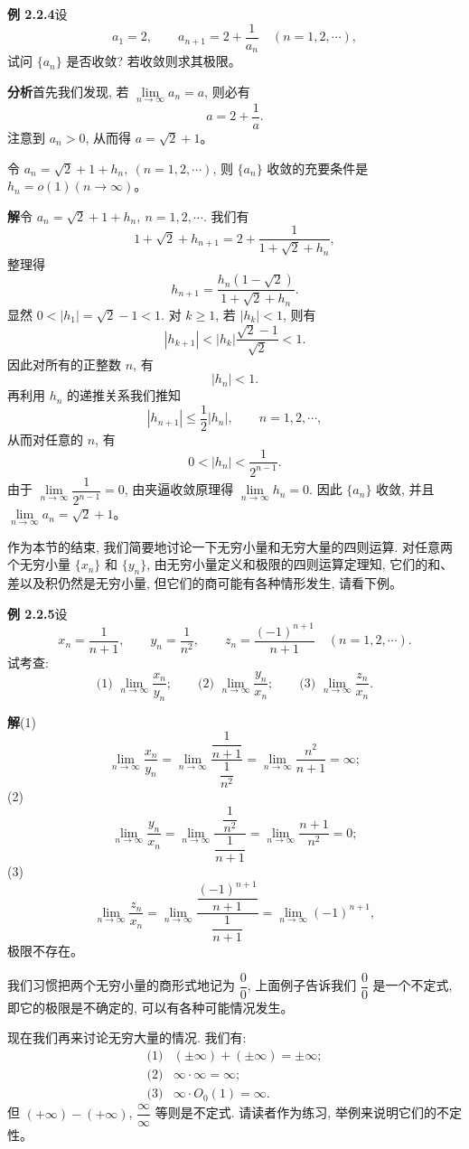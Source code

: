 \documentclass[UTF8,12pt,a4paper,fontset=fandol]{ctexart}
\begin{document}
\noindent\textbf{例 2.2.4}\quad 设
\[
  a_1=2,\qquad a_{n+1}=2+\frac1{a_n}\quad(n=1,2,\cdots),
\]
试问 $\{a_n\}$ 是否收敛? 若收敛则求其极限。

\noindent\textbf{分析}\quad 首先我们发现, 若 $\lim\limits_{n\to\infty}a_n=a$, 则必有
\[
  a=2+\frac1a.
\]
注意到 $a_n>0$, 从而得 $a=\sqrt2+1$。

令 $a_n=\sqrt2+1+h_n,\ (n=1,2,\cdots)$, 则 $\{a_n\}$ 收敛的充要条件是 $h_n=o(1)(n\to\infty)$。

\noindent\textbf{解}\quad 令 $a_n=\sqrt2+1+h_n,\ n=1,2,\cdots$. 我们有
\[
  1+\sqrt2+h_{n+1}=2+\frac1{1+\sqrt2+h_n},
\]
整理得
\[
  h_{n+1}=\frac{h_n(1-\sqrt2)}{1+\sqrt2+h_n}.
\]
显然 $0<|h_1|=\sqrt2-1<1$. 对 $k\geqslant1$, 若 $|h_k|<1$, 则有
\[
  |h_{k+1}|<|h_k|\frac{\sqrt2-1}{\sqrt2}<1.
\]
因此对所有的正整数 $n$, 有
\[
  |h_n|<1.
\]
再利用 $h_n$ 的递推关系我们推知
\[
  |h_{n+1}|\leqslant\frac12|h_n|,\qquad n=1,2,\cdots,
\]
从而对任意的 $n$, 有
\[
  0<|h_n|<\frac1{2^{n-1}}.
\]
由于 $\lim\limits_{n\to\infty}\dfrac1{2^{n-1}}=0$, 由夹逼收敛原理得 $\lim\limits_{n\to\infty}h_n=0$. 因此 $\{a_n\}$ 收敛, 并且 $\lim\limits_{n\to\infty}a_n=\sqrt2+1$。

作为本节的结束, 我们简要地讨论一下无穷小量和无穷大量的四则运算. 对任意两个无穷小量 $\{x_n\}$ 和 $\{y_n\}$, 由无穷小量定义和极限的四则运算定理知, 它们的和、差以及积仍然是无穷小量, 但它们的商可能有各种情形发生, 请看下例。

\noindent\textbf{例 2.2.5}\quad 设
\[
  x_n=\frac1{n+1},\qquad y_n=\frac1{n^2},\qquad z_n=\frac{(-1)^{n+1}}{n+1}\quad(n=1,2,\cdots).
\]
试考查:
\[
  \text{(1) }\lim_{n\to\infty}\frac{x_n}{y_n};\qquad
  \text{(2) }\lim_{n\to\infty}\frac{y_n}{x_n};\qquad
  \text{(3) }\lim_{n\to\infty}\frac{z_n}{x_n}.
\]

\noindent\textbf{解}\quad (1)
\[
  \lim_{n\to\infty}\frac{x_n}{y_n}
  =
  \lim_{n\to\infty}\frac{\dfrac1{n+1}}{\dfrac1{n^2}}
  =
  \lim_{n\to\infty}\frac{n^2}{n+1}
  =
  \infty;
\]
(2)
\[
  \lim_{n\to\infty}\frac{y_n}{x_n}
  =
  \lim_{n\to\infty}\frac{\dfrac1{n^2}}{\dfrac1{n+1}}
  =
  \lim_{n\to\infty}\frac{n+1}{n^2}
  =
  0;
\]
(3)
\[
  \lim_{n\to\infty}\frac{z_n}{x_n}
  =
  \lim_{n\to\infty}\frac{\dfrac{(-1)^{n+1}}{n+1}}{\dfrac1{n+1}}
  =
  \lim_{n\to\infty}(-1)^{n+1},
\]
极限不存在。

我们习惯把两个无穷小量的商形式地记为 $\dfrac00$, 上面例子告诉我们 $\dfrac00$ 是一个不定式, 即它的极限是不确定的, 可以有各种可能情况发生。

现在我们再来讨论无穷大量的情况. 我们有:
\[
\begin{array}{ll}
  \text{(1)} & (\pm\infty)+(\pm\infty)=\pm\infty;\\
  \text{(2)} & \infty\cdot\infty=\infty;\\
  \text{(3)} & \infty\cdot O_0(1)=\infty.
\end{array}
\]
但 $(+\infty)-(+\infty)$, $\dfrac{\infty}{\infty}$ 等则是不定式. 请读者作为练习, 举例来说明它们的不定性。
\end{document}
